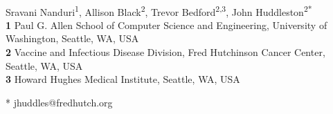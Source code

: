 \documentclass[10pt,letterpaper]{article}
\begin{document}
\vspace*{0.2in}

\begin{flushleft}
{\Large
\textbf{} %
}
\newline
\\
Sravani Nanduri\textsuperscript{1},
Allison Black\textsuperscript{2},
Trevor Bedford\textsuperscript{2,3},
John Huddleston\textsuperscript{2*}
\\
\bigskip
\textbf{1} Paul G. Allen School of Computer Science and Engineering, University of Washington, Seattle, WA, USA
\\
\textbf{2} Vaccine and Infectious Disease Division, Fred Hutchinson Cancer Center, Seattle, WA, USA
\\
\textbf{3} Howard Hughes Medical Institute, Seattle, WA, USA
\\
\bigskip

%
%





* jhuddles@fredhutch.org

\end{flushleft}
\end{document}
